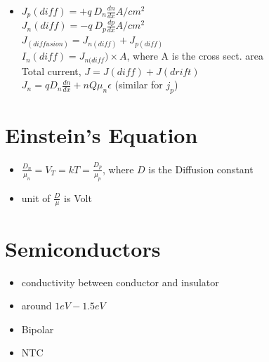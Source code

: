\documentclass[10pt, a4paper]{report}
\begin{document}
\begin{itemize}
  	 	 \item $ J_p(diff) = +q\:D_n\frac{dn}{dx}  A/cm^2$\\$ J_n(diff) = -q\:D_p\frac{dp}{dx}  A/cm^2$ \\
  	 	 $ J_{(diffusion)} = J_{n(diff)} + J_{p(diff)} $ \\
  	 	 $ I_n(diff) = J_{n(diff}) \times A $, where A is the cross sect. area\\
  	 	 Total current, $ J = J(diff) + J(drift) $ \\
   	 	 $ J_n = qD_n\frac{dn}{dx} + nQ\mu_n \epsilon $ (similar for $ j_p $)
	\end{itemize}
	\section{Einstein's Equation}
	\begin{itemize}
		\item $ \frac{D_n}{\mu_n} = V_T = kT = \frac{D_p}{\mu_p} $, where $ D $ is the Diffusion constant
		\item unit of $\frac{D}{\mu}$ is Volt
	\end{itemize}
	\section{Semiconductors}
\begin{itemize}
	\item conductivity between conductor and insulator
	\item around $ 1eV-1.5eV $
	\item Bipolar
	\item NTC
\end{itemize}
\end{document}

